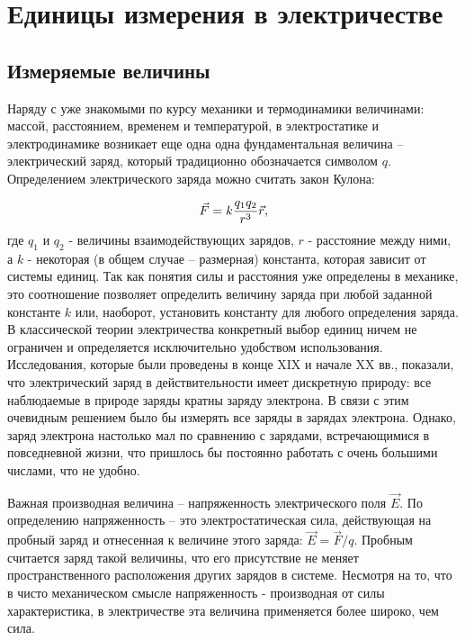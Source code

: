 \section{Единицы измерения в электричестве}

\subsection{Измеряемые величины}

Наряду с уже знакомыми по курсу механики и термодинамики величинами: массой, расстоянием, временем и температурой, в электростатике и электродинамике возникает еще одна одна фундаментальная величина -- электрический заряд, который традиционно обозначается символом $q$. Определением электрического заряда можно считать закон Кулона:

\begin{equation}
	\eqmark
	\vec{F} = k \frac{q_1 q_2}{r^3}\vec{r},
\end{equation}
где $q_1$ и $q_2$ - величины взаимодействующих зарядов, $r$ - расстояние между ними, а $k$ - некоторая (в общем случае -- размерная) константа, которая зависит от системы единиц. Так как понятия силы и расстояния уже определены в механике, это соотношение позволяет определить величину заряда при любой заданной константе $k$ или, наоборот, установить константу для любого определения заряда. В классической теории электричества конкретный выбор единиц ничем не ограничен и определяется исключительно удобством использования. Исследования, которые были проведены в конце XIX и начале XX вв., показали, что электрический заряд в действительности имеет дискретную природу: все наблюдаемые в природе заряды кратны заряду электрона. В связи с этим очевидным решением было бы измерять все заряды в зарядах электрона. Однако, заряд электрона настолько мал по сравнению с зарядами, встречающимися в повседневной жизни, что пришлось бы постоянно работать с очень большими числами, что не удобно.

Важная производная величина -- напряженность электрического поля $\vec{E}$. По определению напряженность -- это электростатическая сила, действующая на пробный заряд и отнесенная к величине этого заряда: $\vec{E} = \vec{F}/q$. Пробным считается заряд такой величины, что его присутствие не меняет пространственного расположения других зарядов в системе. Несмотря на то, что в чисто механическом смысле напряженность - производная от силы характеристика, в электричестве эта величина применяется более широко, чем сила.

